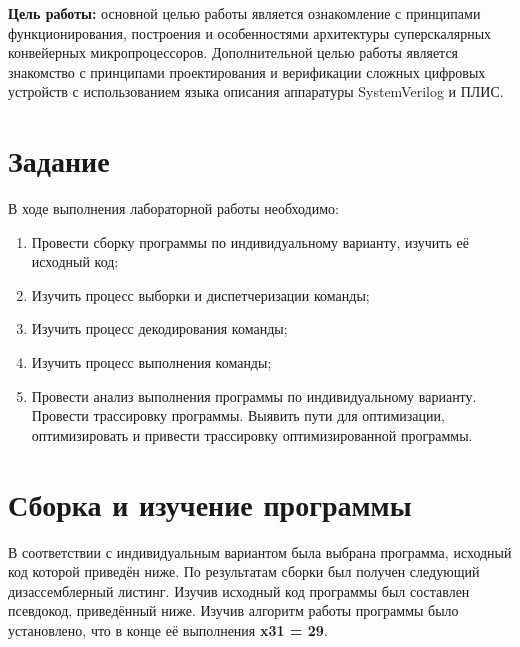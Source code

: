 \documentclass[a4paper, 14pt]{article}
\begin{document}
    \graphicspath{{images/}{images2/}} %
    \renewcommand{\figurename}{Рисунок}

    \author{М.А. Гейне}
    \bmstutitlelab

    \tableofcontents
    \pagebreak

    \textbf{Цель работы:} основной целью работы является ознакомление с принципами функционирования,
    построения и особенностями архитектуры суперскалярных конвейерных микропроцессоров.
    Дополнительной целью работы является знакомство с принципами проектирования и
    верификации сложных цифровых устройств с использованием языка описания аппаратуры
    SystemVerilog и ПЛИС.
    \section*{Задание}
    В ходе выполнения лабораторной работы необходимо:
    \begin{enumerate}
        \item Провести сборку программы по индивидуальному варианту, изучить её исходный код; 
        \item Изучить процесс выборки и диспетчеризации команды;
        \item Изучить процесс декодирования команды;
        \item Изучить процесс выполнения команды;
        \item Провести анализ выполнения программы по индивидуальному варианту. Провести трассировку программы. 
        Выявить пути для оптимизации, оптимизировать и привести трассировку оптимизированной программы.
    \end{enumerate}
    \pagebreak

    \section{Сборка и изучение программы}
    В соответствии с индивидуальным вариантом была выбрана программа, исходный код которой приведён ниже.
    По результатам сборки был получен следующий дизассемблерный листинг.
    Изучив исходный код программы был составлен псевдокод, приведённый ниже.
    Изучив алгоритм работы программы было установлено, что в конце её выполнения \textbf{x31 = 29}.
    
\end{document}
